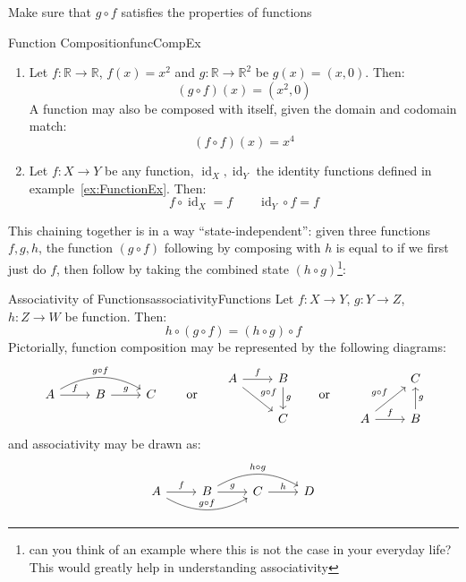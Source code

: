 \documentclass{book}
\newcommand{\R}{{\mathbb{R}}}
\newcommand{\id}{{\operatorname{id}}}
\newcommand{\rw}{\rightarrow}
\begin{document}
\begin{Proof}
	Make sure that $g\circ f$ satisfies the properties of functions
\end{Proof}


\begin{example}{Function Composition}{funcCompEx}
	\begin{enumerate}
		\item Let $f: \R \to \R$, $f(x) = x^2$ and $g: \R \to \R^2$ be $g(x) = (x,0)$. Then:
			\[
				(g\circ f)(x) = (x^2,0)
			\]
			A function may also be composed with itself, given the domain and codomain match:
			\[
				(f\circ f)(x) = x^4
			\]
		\item Let $f: X \to Y$ be any function, $\id_X, \id_Y$ the identity functions defined in
			example~\ref{ex:FunctionEx}. Then:
			\[
				f\circ \id_X = f \qquad \id_Y \circ f = f
			\]
	\end{enumerate}
\end{example}

This chaining together is in a way ``state-independent'': given three functions $f,g,h$, the function $(g\circ
f)$ following by composing with $h$ is equal to if we first just do $f$, then follow by taking the combined
state $(h\circ g)$\footnote{can you think of an example where this is not the case in your everyday life?
This would greatly help in understanding associativity}:

\begin{prop}{Associativity of Functions}{associativityFunctions}
	Let $f: X \rw Y$, $g: Y \rw Z$, $h: Z \rw W$ be function. Then:
	\[
		h\circ(g\circ f) = (h\circ g)\circ f
	\]
	Pictorially, function composition may be represented by the following diagrams:
	\[
		\begin{tikzcd}
A \arrow[r, "f"] \arrow[rr, "g\circ f", bend left] & B \arrow[r, "g"] & C
\end{tikzcd}
\qquad \text{or} \qquad
\begin{tikzcd}
A \arrow[r, "f"] \arrow[rd, "g\circ f"] & B \arrow[d, "g"] \\
                                        & C
\end{tikzcd}
\qquad \text{or} \qquad
\begin{tikzcd}
& C                 \\
A \arrow[r, "f"] \arrow[ru, "g\circ f"] & B \arrow[u, "g"']
\end{tikzcd}
	\]
	and associativity may be drawn as:
	\[
	\begin{tikzcd}
A \arrow[r, "f"] \arrow[rr, "g\circ f", bend right] & B \arrow[r, "g"] \arrow[rr, "h\circ g", bend left] & C \arrow[r, "h"] & D
	\end{tikzcd}
\]
\end{prop}
\end{document}
